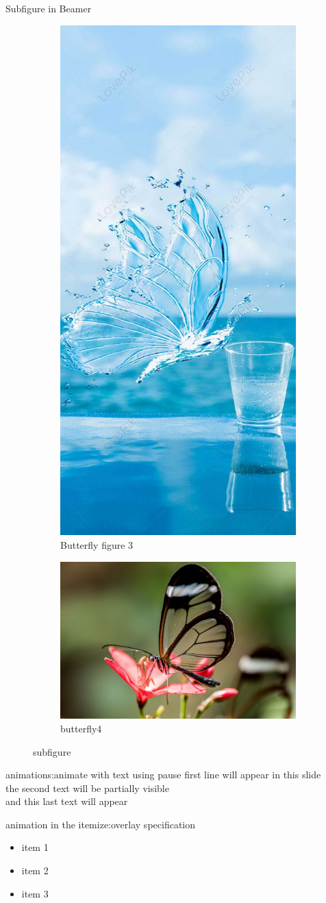 \documentclass[8pt,aspectratio=169]{beamer}
\begin{document}
\begin{frame}{Subfigure in Beamer}
	\begin{figure}[h]
		\begin{subfigure}[t]{0.4\textwidth}
			\centering
		\includegraphics[width=0.5\linewidth]{butterfly3.jpg}
		\caption{Butterfly figure 3}
		\label{fig:butterfly3}
		\end{subfigure}
	\begin{subfigure}[b]{0.4\textwidth}
		\centering
		\includegraphics[width=0.5\linewidth]{butterfly4.jpg}
		\caption{butterfly4}
		\label{fig:butterfly4}	
	\end{subfigure}
\caption{subfigure}
\label{fig:image}
	\end{figure}
\end{frame}
\begin{frame}{animations:animate with text using pause}
	first line will appear in this slide\\ \pause
	the second text will be partially visible\\ \pause
	and this last text will appear
\end{frame}
\begin{frame}{animation in the itemize:overlay specification}
	\begin{itemize}
		\item<1-> item 1
		\item<2-> item 2
		\item<3-> item 3
	\end{itemize}
	
\end{frame}
\end{document}
